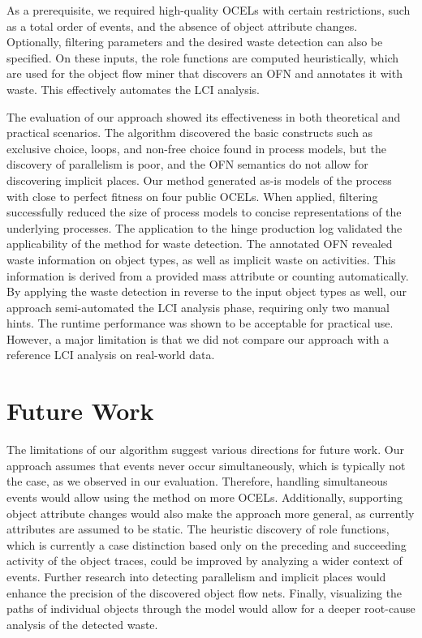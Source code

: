 As a prerequisite, we required high-quality OCELs with certain restrictions, such as a total order of events, and the absence of object attribute changes.
Optionally, filtering parameters and the desired waste detection can also be specified.
On these inputs, the role functions are computed heuristically, which are used for the object flow miner that discovers an OFN and annotates it with waste.
This effectively automates the LCI analysis.



    
The evaluation of our approach showed its effectiveness in both theoretical and practical scenarios.
The algorithm discovered the basic constructs such as exclusive choice, loops, and non-free choice found in process models, but the discovery of parallelism is poor, and the OFN semantics do not allow for discovering implicit places.
Our method generated as-is models of the process with close to perfect fitness on four public OCELs.
When applied, filtering successfully reduced the size of process models to concise representations of the underlying processes.
The application to the hinge production log validated the applicability of the method for waste detection.
The annotated OFN revealed waste information on object types, as well as implicit waste on activities.
This information is derived from a provided mass attribute or counting automatically.
By applying the waste detection in reverse to the input object types as well, our approach semi-automated the LCI analysis phase, requiring only two manual hints.
The runtime performance was shown to be acceptable for practical use.
However, a major limitation is that we did not compare our approach with a reference LCI analysis on real-world data.



\section{Future Work}

The limitations of our algorithm suggest various directions for future work.
Our approach assumes that events never occur simultaneously, which is typically not the case, as we observed in our evaluation.
Therefore, handling simultaneous events would allow using the method on more OCELs.
Additionally, supporting object attribute changes would also make the approach more general, as currently attributes are assumed to be static.
The heuristic discovery of role functions, which is currently a case distinction based only on the preceding and succeeding activity of the object traces, could be improved by analyzing a wider context of events.
Further research into detecting parallelism and implicit places would enhance the precision of the discovered object flow nets.
Finally, visualizing the paths of individual objects through the model would allow for a deeper root-cause analysis of the detected waste.

